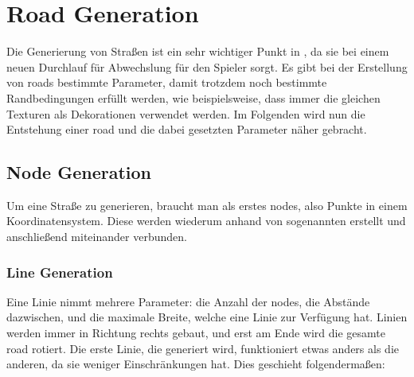 
\section{Road Generation}\label{sec:road-generation}

\renewcommand{\kapitelautor}{Autor: Felix Zwickelstorfer}

Die Generierung von Straßen ist ein sehr wichtiger Punkt in \FF, da sie bei einem neuen Durchlauf für Abwechslung für den Spieler sorgt.
Es gibt bei der Erstellung von roads bestimmte Parameter, damit trotzdem noch bestimmte Randbedingungen erfüllt werden, wie beispielsweise, dass immer die gleichen Texturen als Dekorationen verwendet werden.
Im Folgenden wird nun die Entstehung einer road und die dabei gesetzten Parameter näher gebracht.

\subsection{Node Generation}\label{subsec:node-generation}
Um eine Straße zu generieren, braucht man als erstes nodes, also Punkte in einem Koordinatensystem.
Diese werden wiederum anhand von sogenannten  erstellt und anschließend miteinander verbunden.

\subsubsection{Line Generation}\label{subsubsec:line-generation}
Eine Linie nimmt mehrere Parameter: die Anzahl der nodes, die Abstände dazwischen, und die maximale Breite, welche eine Linie zur Verfügung hat.
Linien werden immer in Richtung rechts gebaut, und erst am Ende wird die gesamte road rotiert.
Die erste Linie, die generiert wird, funktioniert etwas anders als die anderen, da sie weniger Einschränkungen hat.
Dies geschieht folgendermaßen:

